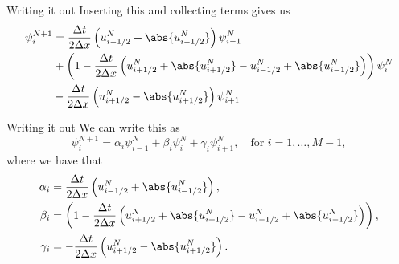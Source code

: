 \documentclass[hyperref={pdfstartview=Fit}]{beamer}
\begin{document}
\begin{frame}{Writing it out}
Inserting this and collecting terms gives us
\begin{equation*}
\begin{split}
\psi_i^{N+1} &=
\frac{\Delta t}{2 \Delta x} \left( u_{i-1/2}^N + \abs{u_{i-1/2}^N} \right) \psi_{i-1}^N\\
&+ \left(1 - \frac{\Delta t}{2 \Delta x} \left( u_{i+1/2}^N + \abs{u_{i+1/2}^N} - u_{i-1/2}^N + \abs{u_{i-1/2}^N} \right) \right) \psi_i^N\\
&-\frac{\Delta t}{2 \Delta x} \left( u_{i+1/2}^N - \abs{u_{i+1/2}^N} \right) \psi_{i+1}^N\\
\end{split}
\end{equation*}
\end{frame}

\begin{frame}{Writing it out}
We can write this as
\begin{equation*}
\psi_i^{N+1} = \alpha_i \psi_{i-1}^N + \beta_i \psi_i^N +\gamma_i \psi_{i+1}^N, \quad \text{for } i=1,\ldots,M-1,
\end{equation*}
 where we have that
\begin{align*}
\alpha_i &= \frac{\Delta t}{2 \Delta x} \left( u_{i-1/2}^N + \abs{u_{i-1/2}^N} \right),\\
 \beta_i &= \left(1 - \frac{\Delta t}{2 \Delta x} \left( u_{i+1/2}^N + \abs{u_{i+1/2}^N} - u_{i-1/2}^N + \abs{u_{i-1/2}^N} \right) \right),\\
\gamma_i &= -\frac{\Delta t}{2 \Delta x} \left( u_{i+1/2}^N - \abs{u_{i+1/2}^N} \right).
\end{align*}
\end{frame}
\end{document}
